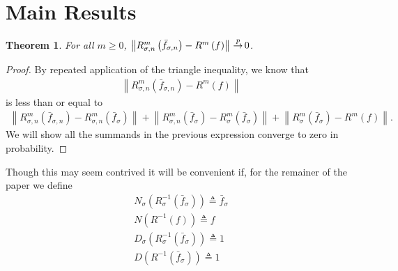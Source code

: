 \documentclass{article} %
\def\kde{{\bar{f}_{\sigma,n}}} %
\def\gkde{{\bar{f}_\sigma}} %
\def\cip{\,{\buildrel p \over \rightarrow}\,}
\def\irwlm{{R_{\sigma,n}^{m}}}
\def\girwlm{{R_{\sigma}^m}}
\def\l{\left}
\def\r{\right}
\newtheorem{thm}{Theorem}
\theoremstyle{definition}
\begin{document}
\section{Main Results}

\begin{thm}\label{thm:main}
	For all $m\ge 0$, $\l\|\irwlm\left(\kde  \right) - R^m\left( f \right) \r\|\cip 0$.
\end{thm}
\begin{proof}
	By repeated application of the triangle inequality, we know that
	\begin{eqnarray*}
		\l\|\irwlm\left(\kde  \right) - R^m\left( f \right) \r\|
	\end{eqnarray*}
	is less than or equal to
	\begin{eqnarray*}
		 \l\|\irwlm\left( \kde \right) - \irwlm\left( \gkde \right) \r\| + \l\| \irwlm\left( \gkde \right)- \girwlm\left( \gkde \right)  \r\| + \l\|\girwlm\left( \gkde \right) - R^m \left( f \right)\r\|.
	\end{eqnarray*}
	We will show all the summands in the previous expression converge to zero in probability.
\end{proof}

Though this may seem contrived it will be convenient if, for the remainer of the paper we define
\begin{eqnarray*}
	N_\sigma\left( R_{\sigma}^{-1}\left( \gkde \right) \right) \triangleq \gkde\\
	N\left( R^{-1}\left( f \right) \right) \triangleq f\\
	D_\sigma\left( R_{\sigma}^{-1}\left( \gkde \right) \right) \triangleq 1\\
	D\left( R^{-1}\left( \gkde \right) \right) \triangleq 1
\end{eqnarray*}
\end{document}
